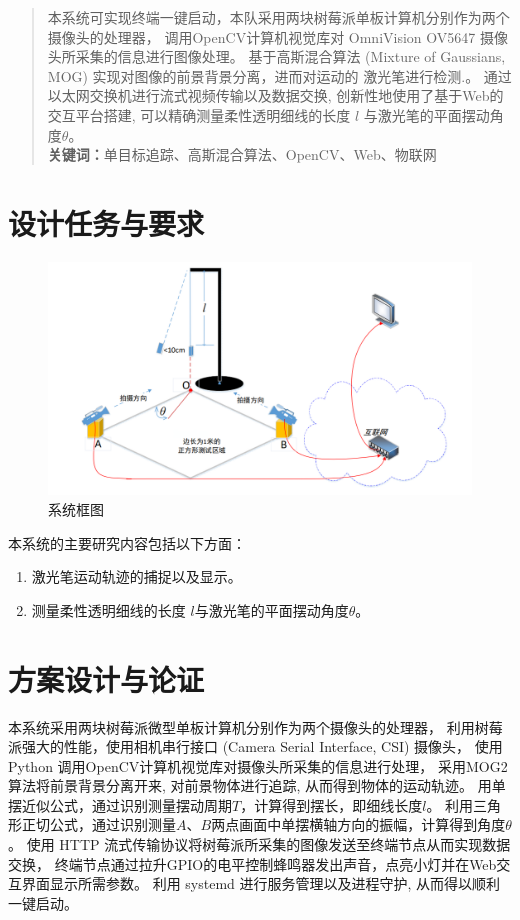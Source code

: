\documentclass[scheme=chinese,a4paper]{article}
\begin{document}
\begin{abstract}

  

本系统可实现终端一键启动，本队采用两块树莓派单板计算机分别作为两个摄像头的处理器，
调用OpenCV计算机视觉库对 OmniVision OV5647 摄像头所采集的信息进行图像处理。
基于高斯混合算法 (Mixture of Gaussians, MOG) 实现对图像的前景背景分离，进而对运动的
激光笔进行检测.。
通过以太网交换机进行流式视频传输以及数据交换, 创新性地使用了基于Web的交互平台搭建, 
可以精确测量柔性透明细线的长度 $l$ 与激光笔的平面摆动角度$\theta$。\\
\textbf{关键词：}单目标追踪、高斯混合算法、OpenCV、Web、物联网
\end{abstract}

\section{设计任务与要求}
\begin{figure}[H]
    \centering
    \includegraphics[width=1\textwidth]{3.png}
    \caption{系统框图}
\end{figure}
本系统的主要研究内容包括以下方面：

\begin{enumerate}
  \item 激光笔运动轨迹的捕捉以及显示。
  \item 测量柔性透明细线的长度 $l$与激光笔的平面摆动角度$\theta$。
\end{enumerate}

\section{方案设计与论证}
本系统采用两块树莓派微型单板计算机分别作为两个摄像头的处理器，
利用树莓派强大的性能，使用相机串行接口 (Camera Serial Interface, CSI) 摄像头，
使用 Python 调用OpenCV计算机视觉库对摄像头所采集的信息进行处理，
采用MOG2算法将前景背景分离开来, 对前景物体进行追踪, 从而得到物体的运动轨迹。
用单摆近似公式，通过识别测量摆动周期$T$，计算得到摆长，即细线长度$l$。
利用三角形正切公式，通过识别测量$A$、$B$两点画面中单摆横轴方向的振幅，计算得到角度$\theta$。
使用 HTTP 流式传输协议将树莓派所采集的图像发送至终端节点从而实现数据交换，
终端节点通过拉升GPIO的电平控制蜂鸣器发出声音，点亮小灯并在Web交互界面显示所需参数。
利用 systemd 进行服务管理以及进程守护, 从而得以顺利一键启动。
\end{document}

